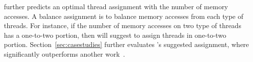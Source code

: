 

\NP{} further predicts an optimal thread assignment with the number of memory accesses. A balance assignment is to balance  memory accesses from each type of threads. For instance, if the number of memory accesses on two type of threads has a one-to-two portion, then \NP{} will suggest to assign threads in one-to-two portion. Section~\ref{sec:casestudies} further evaluates \NP{}'s suggested assignment, where \NP{} significantly outperforms another work~\cite{SyncPerf}.


